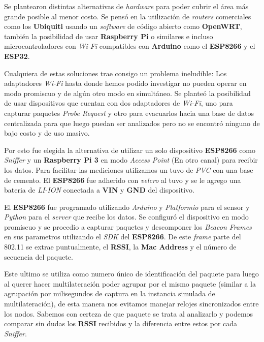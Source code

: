 Se plantearon distintas alternativas de \textit{hardware} para poder cubrir el área más grande posible al menor costo. Se pensó en la utilización de \textit{routers} comerciales como los \textbf{Ubiquiti} usando un \textit{software} de código abierto como \textbf{OpenWRT}, también la posibilidad de usar \textbf{Raspberry Pi} o similares e incluso microcontroladores con \textit{Wi-Fi} compatibles con \textbf{Arduino} como el \textbf{ESP8266} y el \textbf{ESP32}. 

Cualquiera de estas soluciones trae consigo un problema ineludible: Los adaptadores \textit{Wi-Fi} hasta donde hemos podido investigar no pueden operar en modo promiscuo y de algún otro modo en simultáneo. Se planteó la posibilidad de usar dispositivos que cuentan con dos adaptadores de \textit{Wi-Fi}, uno para capturar paquetes \textit{Probe Request} y otro para evacuarlos hacia una base de datos centralizada para que luego puedan ser analizados pero no se encontró ninguno de bajo costo y de uso masivo.

Por esto fue elegida la alternativa de utilizar un solo dispositivo \textbf{ESP8266} como \textit{Sniffer} y un \textbf{Raspberry Pi 3} en modo \textit{Access Point} (En otro canal) para recibir los datos. Para facilitar las mediciones utilizamos un tuvo de \textit{PVC} con una base de cemento. El \textbf{ESP8266} fue adherido con \textit{velcro} al tuvo y se le agrego una bateria de \textit{LI-ION} conectada a \textbf{VIN} y \textbf{GND} del dispositivo.


El \textbf{ESP8266} fue programado utilizando \textit{Arduino} y \textit{Platformio} para el sensor y \textit{Python} para el \textit{server} que recibe los datos. Se configuró el dispositivo en modo promiscuo y se procedio a capturar paquetes y descomponer los \textit{Beacon Frames} en sus parametros utilizando el \textit{SDK} del \textbf{ESP8266}. De este \textit{frame} parte del 802.11 se extrae puntualmente, el \textbf{RSSI}, la \textbf{Mac Address} y el número de secuencia del paquete.

Este ultimo se utiliza como numero único de identificación del paquete para luego al querer hacer multilateración poder agrupar por el mismo paquete (similar a la agrupación por milisegundos de captura en la instancia simulada de multilateración), de esta manera nos evitamos manejar relojes sincronizados entre los nodos. Sabemos con certeza de que paquete se trata al analizarlo y podemos comparar sin dudas los \textbf{RSSI} recibidos y la diferencia entre estos por cada \textit{Sniffer}. 

